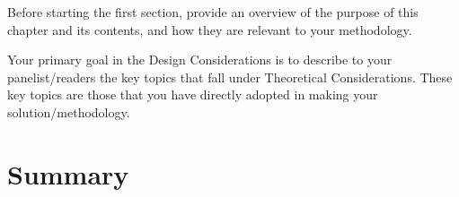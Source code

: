 Before starting the first section, provide an overview of the purpose of this chapter and its contents, and how they are relevant to your methodology.


Your primary goal in the Design Considerations is to describe to your panelist/readers the key topics that fall under Theoretical Considerations. These key topics are those that you have directly adopted in making your solution/methodology. 


\textcolor[rgb]{0.75,0.75,0.75}{\Blindtext}


\section{Summary}